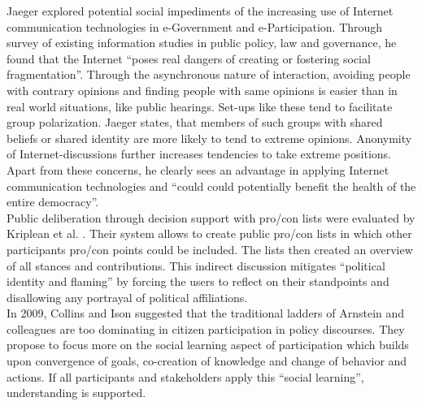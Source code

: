 Jaeger \cite{Jaeger2005_deliberate_democracy_and_egovernment} explored potential social impediments of the increasing use of Internet communication technologies in e-Government and e-Participation. Through survey of existing information studies in public policy, law and governance, he found that the Internet ``poses real dangers of creating or fostering social fragmentation''. Through the asynchronous nature of interaction, avoiding people with contrary opinions and finding people with same opinions is easier than in real world situations, like public hearings. Set-ups like these tend to facilitate group polarization. Jaeger states, that members of such groups with shared beliefs or shared identity are more likely to tend to extreme opinions. Anonymity of Internet-discussions further increases tendencies to take extreme positions. Apart from these concerns, he clearly sees an advantage in applying Internet communication technologies and ``could could potentially benefit the health of the entire democracy''.\\
Public deliberation through decision support with pro/con lists were evaluated by Kriplean et al. \cite{Kriplean2012_Considerit}. Their system allows to create public pro/con lists in which other participants pro/con points could be included. The lists then created an overview of all stances and contributions. This indirect discussion mitigates ``political identity and flaming'' by forcing the users to reflect on their standpoints and disallowing any portrayal of political affiliations.\\
In 2009, Collins and Ison \cite{Collins2009_social_learning} suggested that the traditional ladders of Arnstein and colleagues are too dominating in citizen participation in policy discourses. They propose to focus more on the social learning aspect of participation which builds upon convergence of goals, co-creation of knowledge and change of behavior and actions. If all participants and stakeholders apply this ``social learning'', understanding is supported.%

